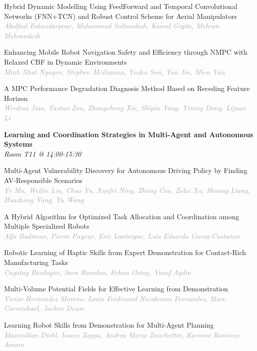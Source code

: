 \begin{multicols*}{2}
\small Hybrid Dynamic Modelling Using FeedForward and Temporal Convolutional Networks (FNN+TCN) and Robust Control Scheme for Aerial Manipulators\\ 
\footnotesize \textcolor{darkgray}{\textit{Abolfazl Eskandarpour, Mohammad  Soltanshah, Kamal  Gupta, Mehran  Mehrandezh}}

\small Enhancing Mobile Robot Navigation Safety and Efficiency through NMPC with Relaxed CBF in Dynamic Environments\\ 
\footnotesize \textcolor{darkgray}{\textit{Minh Nhat Nguyen, Stephen  Mcilvanna, Yuzhu  Sun, Yan  Jin, Mien  Van}}

\small A MPC Performance Degradation Diagnosis Method Based on Receding Feature Horizon\\ 
\footnotesize \textcolor{darkgray}{\textit{Wenhua Jiao, Taotao  Zou, Zhangcheng  Xie, Shipin  Yang, Yining  Dong, Lijuan  Li}}

\normalsize \textbf{Learning and Coordination Strategies in Multi-Agent and Autonomous Systems}\\
\small \textit{Room T11 @ 14:00-15:30}

\small Multi-Agent Vulnerability Discovery for Autonomous Driving Policy by Finding AV-Responsible Scenarios\\ 
\footnotesize \textcolor{darkgray}{\textit{Ye Mu, Weilin  Liu, Chao  Yu, Xuefei  Ning, Zhong  Cao, Zelai  Xu, Shuang  Liang, Huazhong  Yang, Yu  Wang}}

\small A Hybrid Algorithm for Optimized Task Allocation and Coordination among Multiple Specialized Robots\\ 
\footnotesize \textcolor{darkgray}{\textit{Alfa Budiman, Pierre  Payeur, Eric  Lanteigne, Luis Eduardo  Garza-Castañon}}

\small Robotic Learning of Haptic Skills from Expert Demonstration for Contact-Rich Manufacturing Tasks\\ 
\footnotesize \textcolor{darkgray}{\textit{Cagatay Basdogan, Sara  Hamdan, Erhan  Oztop, Yusuf  Aydin}}

\small Multi-Volume Potential Fields for Effective Learning from Demonstration\\ 
\footnotesize \textcolor{darkgray}{\textit{Victor Hernandez Moreno, Louis Ferdinand Nicodemus  Fernandez, Marc  Carmichael, Jochen  Deuse}}

\small Learning Robot Skills from Demonstration for Multi-Agent Planning\\ 
\footnotesize \textcolor{darkgray}{\textit{Maximilian Diehl, Isacco  Zappa, Andrea Maria  Zanchettin, Karinne  Ramirez-Amaro}}


\end{multicols*}
